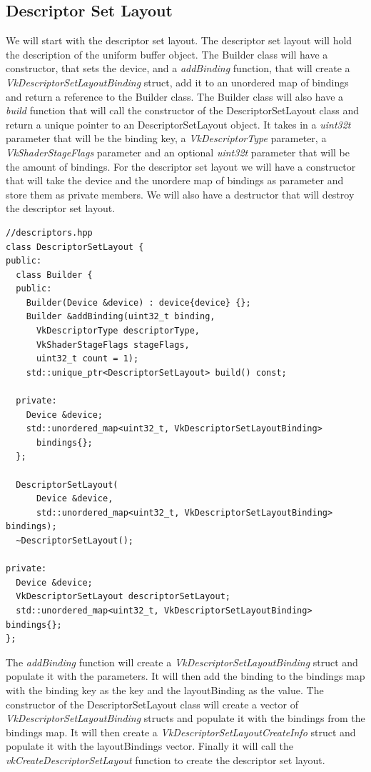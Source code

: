 \documentclass[12pt]{report} \usepackage{preamble}
\begin{document}
\subsection{Descriptor Set Layout}

We will start with the descriptor set layout. The descriptor set layout will hold the description of the uniform buffer object.
The Builder class will have a constructor, that sets the device, and a \textit{addBinding} function, that will create a
\textit{VkDescriptorSetLayoutBinding} struct, add it to an unordered map of bindings and return a reference to the Builder class.
The Builder class will also have a \textit{build} function that will call the constructor of the DescriptorSetLayout class
and return a unique pointer to an DescriptorSetLayout object. It takes in a \textit{uint32\textunderscore t} parameter that will be the binding key,
a \textit{VkDescriptorType} parameter, a \textit{VkShaderStageFlags} parameter and an optional \textit{uint32\textunderscore t} parameter that will be the amount of bindings.
For the descriptor set layout we will have a constructor that will take the device and the
unordere map of bindings as parameter and store them as private members. We will also have a destructor that will destroy the descriptor set layout.

\begin{lstlisting}[Language=C++]
//descriptors.hpp
class DescriptorSetLayout {
public:
  class Builder {
  public:
    Builder(Device &device) : device{device} {};
    Builder &addBinding(uint32_t binding, 
      VkDescriptorType descriptorType, 
      VkShaderStageFlags stageFlags, 
      uint32_t count = 1);
    std::unique_ptr<DescriptorSetLayout> build() const;

  private:
    Device &device;
    std::unordered_map<uint32_t, VkDescriptorSetLayoutBinding> 
      bindings{};
  };

  DescriptorSetLayout(
      Device &device,
      std::unordered_map<uint32_t, VkDescriptorSetLayoutBinding> bindings);
  ~DescriptorSetLayout();

private:
  Device &device;
  VkDescriptorSetLayout descriptorSetLayout;
  std::unordered_map<uint32_t, VkDescriptorSetLayoutBinding> bindings{};
};
\end{lstlisting}

The \textit{addBinding} function will create a \textit{VkDescriptorSetLayoutBinding} struct and populate it with the parameters.
It will then add the binding to the bindings map with the binding key as the key and the layoutBinding as the value.
The constructor of the DescriptorSetLayout class will create a vector of \textit{VkDescriptorSetLayoutBinding} structs and populate it with the bindings from the bindings map.
It will then create a \textit{VkDescriptorSetLayoutCreateInfo} struct and populate it with the layoutBindings vector.
Finally it will call the \textit{vkCreateDescriptorSetLayout} function to create the descriptor set layout.
\end{document}
